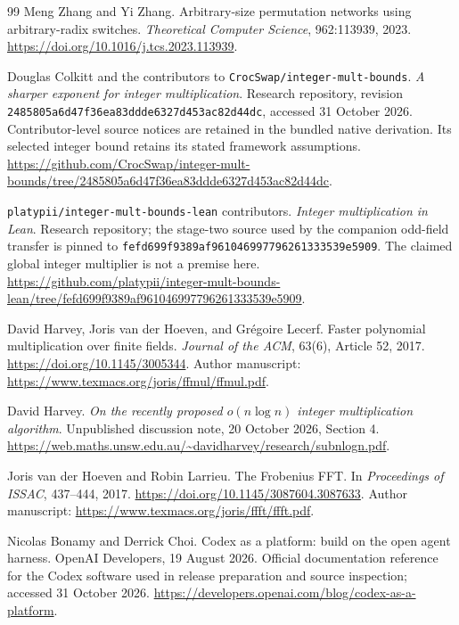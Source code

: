 \documentclass[11pt]{article}
\begin{document}
\begin{thebibliography}{99}
Meng Zhang and Yi Zhang.
\newblock Arbitrary-size permutation networks using arbitrary-radix switches.
\newblock \emph{Theoretical Computer Science}, 962:113939, 2023.
\newblock \url{https://doi.org/10.1016/j.tcs.2023.113939}.

Douglas Colkitt and the contributors to \texttt{CrocSwap/integer-mult-bounds}.
\newblock \emph{A sharper exponent for integer multiplication}.
\newblock Research repository, revision \texttt{2485805a6d47f36ea83ddde6327d453ac82d44dc},
accessed 31 October 2026. Contributor-level source notices are retained
in the bundled native derivation. Its selected integer bound retains
its stated framework assumptions.
\newblock \url{https://github.com/CrocSwap/integer-mult-bounds/tree/2485805a6d47f36ea83ddde6327d453ac82d44dc}.

\texttt{platypii/integer-mult-bounds-lean} contributors.
\newblock \emph{Integer multiplication in Lean}.
\newblock Research repository; the stage-two source used by the companion
odd-field transfer is pinned to \texttt{fefd699f9389af961046997796261333539e5909}.
The claimed global integer multiplier is not a premise here.
\newblock \url{https://github.com/platypii/integer-mult-bounds-lean/tree/fefd699f9389af961046997796261333539e5909}.

David Harvey, Joris van der Hoeven, and Gr\'egoire Lecerf.
\newblock Faster polynomial multiplication over finite fields.
\newblock \emph{Journal of the ACM}, 63(6), Article 52, 2017.
\newblock \url{https://doi.org/10.1145/3005344}.
\newblock Author manuscript: \url{https://www.texmacs.org/joris/ffmul/ffmul.pdf}.

David Harvey.
\newblock \emph{On the recently proposed $o(n\log n)$ integer multiplication algorithm}.
\newblock Unpublished discussion note, 20 October 2026, Section 4.
\newblock \url{https://web.maths.unsw.edu.au/~davidharvey/research/subnlogn.pdf}.

Joris van der Hoeven and Robin Larrieu.
\newblock The Frobenius FFT.
\newblock In \emph{Proceedings of ISSAC}, 437--444, 2017.
\newblock \url{https://doi.org/10.1145/3087604.3087633}.
\newblock Author manuscript: \url{https://www.texmacs.org/joris/ffft/ffft.pdf}.

Nicolas Bonamy and Derrick Choi.
\newblock Codex as a platform: build on the open agent harness.
\newblock OpenAI Developers, 19 August 2026. Official documentation
reference for the Codex software used in release preparation and source
inspection; accessed 31 October 2026.
\newblock \url{https://developers.openai.com/blog/codex-as-a-platform}.

\end{thebibliography}
\end{document}
